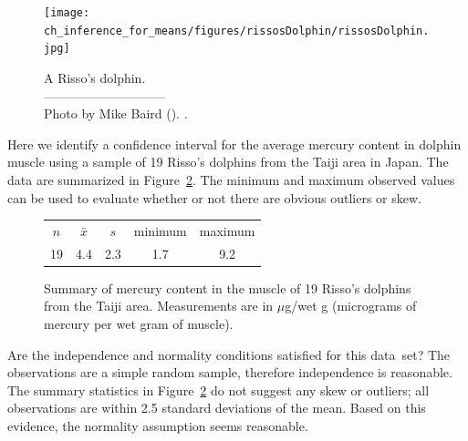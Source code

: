 \begin{figure}[h]
\centering
\texttt{[image: ch\_inference\_for\_means/figures/rissosDolphin/rissosDolphin.jpg]}  \\
\addvspace{2mm}
\begin{minipage}{\textwidth}
   \caption[rissosDolphinPic]{A Risso's dolphin.\vspace{-1mm} \\
   -----------------------------\vspace{-2mm}\\
   {\footnotesize Photo by Mike Baird (). .}\vspace{-8mm}}
   \label{rissosDolphin}
\end{minipage}
\stdvspace{}
\end{figure}
\setlength{\captionwidth}{\mycaptionwidth}

Here we identify a confidence interval for the average mercury content in dolphin muscle using a sample of 19 Risso's dolphins from the Taiji area in Japan. The data are summarized in Figure~\ref{summaryStatsOfHgInMuscleOfRissosDolphins}. The minimum and maximum observed values can be used to evaluate whether or not there are obvious outliers or skew.

\begin{figure}[h]
\centering
\begin{tabular}{ccc cc}
\hline
$n$ & $\bar{x}$ & $s$ & minimum & maximum \\
19   & 4.4	  & 2.3  & 1.7	       & 9.2 \\
\hline
\end{tabular}
\caption{Summary of mercury content in the muscle of 19 Risso's dolphins from the Taiji area. Measurements are in $\mu$g/wet g (micrograms of mercury per wet gram of muscle).}
\label{summaryStatsOfHgInMuscleOfRissosDolphins}
\end{figure}

\begin{examplewrap}
\begin{nexample}{Are the independence and normality
    conditions satisfied for this data~set?}
  The observations are a simple random sample,
  therefore independence is reasonable.
  The summary statistics in
  Figure~\ref{summaryStatsOfHgInMuscleOfRissosDolphins}
  do not suggest any skew or outliers;
  all observations are within 2.5 standard deviations
  of the mean.
  Based on this evidence, the normality assumption
  seems reasonable.
\end{nexample}
\end{examplewrap}

